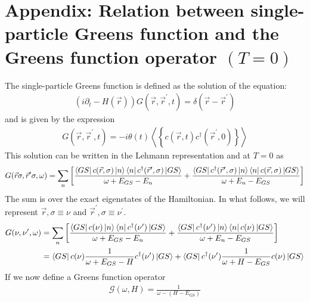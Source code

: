 \documentclass{article}
\numberwithin{equation}{section}
\begin{document}
\section*{Appendix: Relation between single-particle Greens function and the Greens function operator $(T=0)$}
 The single-particle Greens function is defined as the solution of the equation:
 \begin{equation}\begin{aligned}
	 \left(i\partial_t - H(\vec r)\right)G(\vec r,\vec r^\prime, t) = \delta(\vec r - \vec r^\prime)
 \end{aligned}\end{equation}
 and is given by the expression
 \begin{equation}\begin{aligned}
	 G(\vec r,\vec r^\prime, t) = -i \theta(t) \left< \left\{ c(\vec r, t) c^\dagger(\vec r^\prime, 0)\right\} \right>
 \end{aligned}\end{equation}
 This solution can be written in the Lehmann representation  and at $T=0$ as
 \begin{equation}\begin{aligned}
	 G(\vec r \sigma, \vec r^\prime \sigma, \omega) = \sum_{n}\left[\frac{\bra{GS}c({\vec r,\sigma})\ket{n}\bra{n}c^\dagger(\vec r^\prime,\sigma)\ket{GS}}{\omega + E_{GS} - E_n} + \frac{\bra{GS}c^\dagger(\vec r^\prime,\sigma)\ket{n}\bra{n}c({\vec r,\sigma})\ket{GS}}{\omega + E_n - E_{GS}}\right]
 \end{aligned}\end{equation}
 The sum is over the exact eigenstates of the Hamiltonian. In what follows, we will represent $\vec r,\sigma \equiv \nu$ and $\vec r^\prime,\sigma \equiv \nu^\prime$.
 \begin{equation}\begin{aligned}
	 G(\nu, \nu^\prime, \omega) &= \sum_{n}\left[\frac{\bra{GS}c(\nu)\ket{n}\bra{n}c^\dagger(\nu^\prime)\ket{GS}}{\omega + E_{GS} - E_n} + \frac{\bra{GS}c^\dagger(\nu^\prime)\ket{n}\bra{n}c(\nu)\ket{GS}}{\omega + E_n - E_{GS}}\right]\\
							&= \bra{GS}c(\nu)\frac{1}{\omega + E_{GS} - H}c^\dagger(\nu^\prime)\ket{GS} + \bra{GS}c^\dagger(\nu^\prime)\frac{1}{\omega + H - E_{GS}}c(\nu)\ket{GS}\\
 \end{aligned}\end{equation}
 If we now define a Greens function operator
 \begin{equation}\begin{aligned}
	 \label{inv_G_func}
	 \mathcal{G}(\omega, H) = \frac{1}{\omega - (H - E_\text{GS})}
 \end{aligned}\end{equation}
\end{document}
